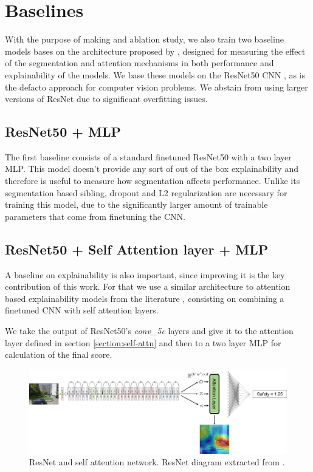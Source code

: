 \section{Baselines}
With the purpose of making and ablation study, we also train two baseline models
bases on the architecture proposed by , designed for
measuring the effect of the segmentation and attention mechanisms in both performance
and explainability of the models. We base these models on the ResNet50 CNN \cite{he_resnet},
as is the defacto approach for computer vision problems. We abstain from using larger
versions of ResNet due to significant overfitting issues.

\subsection{ResNet50 + MLP}
The first baseline consists of a standard finetuned ResNet50 with a two layer MLP. This
model doesn't provide any sort of out of the box explainability and therefore is useful
to measure how segmentation affects performance.
Unlike its segmentation based sibling, dropout and L2 regularization are necessary for training
this model, due to the significantly larger amount of trainable parameters that come from finetuning the CNN.

\subsection{ResNet50 + Self Attention layer + MLP}

A baseline on explainability is also important, since improving it is the key contribution
of this work. For that we use a similar architecture to attention based explainability
models from the literature \cite{zhang_interpretable, cordonnier_relationship, bello_attention}, consisting on
combining a finetuned CNN with self attention layers.

We take the output of ResNet50's \textit{conv\_5c} layers and give it to the attention layer
defined in section \ref{section:self-attn} and then to a two layer MLP for calculation of the final score.

\begin{figure}[ht]
	\begin{center}
	\includegraphics[width=1\textwidth]{./figures/attn_baseline.png}
	\caption[ResNet + SelfAttention]{ResNet and self attention network. ResNet diagram extracted from .}
	\label{fig:attn_resnet}
	\end{center}
\end{figure}